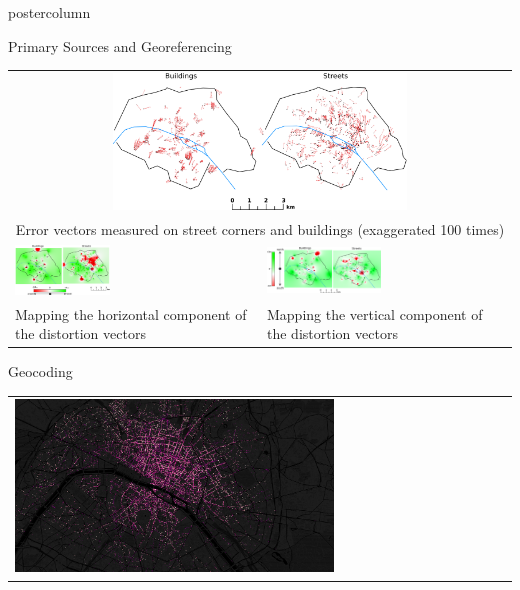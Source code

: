 \documentclass[final,hyperref={pdfpagelabels=false}]{beamer}
\begin{document}
\begin{frame}
\begin{columns}
\begin{column}{0.5\textwidth}
\begin{beamercolorbox}[center,wd=\textwidth]{postercolumn}
\begin{minipage}[t]{.98\textwidth}
\begin{block}{Primary Sources and Georeferencing}
\begin{tabular}{p{}p{}}
          \multicolumn{2}{c}{\includegraphics[width=0.6\textwidth]{figures/errorthemes.png}}\\
	  \multicolumn{2}{c}{\scriptsize Error vectors measured on street corners and buildings (exaggerated 100 times)}\\
          \vspace{0pt}
          \includegraphics[width=0.4\textwidth]{figures/error_x.png}&
          \vspace{0pt}
          \includegraphics[width=0.48\textwidth]{figures/error_y.png}\\
	  \scriptsize Mapping the horizontal component of the distortion vectors&
          \scriptsize Mapping the vertical component of the distortion vectors
        \end{tabular}
      \end{block}
      \begin{block}{Geocoding}
        \begin{tabular}{>{\centering}m{}}
          \includegraphics[width=0.65\textwidth]{figures/geocoding}\\

\end{tabular}
\end{block}
\end{minipage}
\end{beamercolorbox}
\end{column}
\end{columns}
\end{frame}
\end{document}
